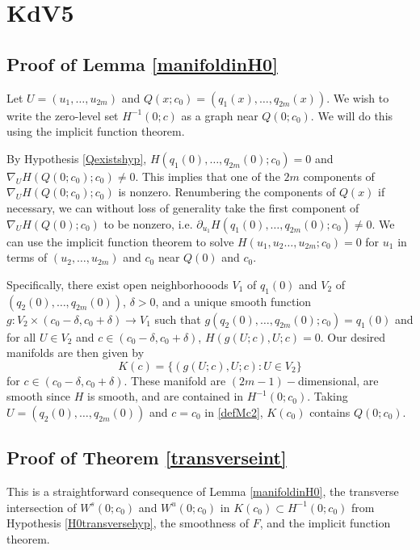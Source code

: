 \documentclass[thesis.tex]{subfiles}
\begin{document}
\iffulldocument\else
	\chapter{KdV5}
\fi

\section{Proof of Lemma \ref{manifoldinH0}}

Let $U = (u_1, \dots, u_{2m})$ and $Q(x; c_0) = (q_1(x), \dots, q_{2m}(x))$. We wish to write the zero-level set $H^{-1}(0; c)$ as a graph near $Q(0; c_0)$. We will do this using the implicit function theorem.

By Hypothesis \ref{Qexistshyp}, $H(q_1(0), \dots, q_{2m}(0); c_0) = 0$ and $\nabla_U H(Q(0; c_0); c_0) \neq 0$. This implies that one of the $2m$ components of $\nabla_U H(Q(0; c_0); c_0)$ is nonzero. Renumbering the components of $Q(x)$ if necessary, we can without loss of generality take the first component of $\nabla_U H(Q(0); c_0)$ to be nonzero, i.e. $\partial_{u_1}H(q_1(0), \dots, q_{2m}(0); c_0) \neq 0$. We can use the implicit function theorem to solve $H(u_1, u_2 \dots, u_{2m}; c_0) = 0$ for $u_1$ in terms of $(u_2, \dots, u_{2m})$ and $c_0$ near $Q(0)$ and $c_0$.

Specifically, there exist open neighborhooods $V_1$ of $q_1(0)$ and $V_2$ of $(q_2(0), \dots, q_{2m}(0))$, $\delta > 0$, and a unique smooth function $g: V_2 \times (c_0 - \delta, c_0 + \delta) \rightarrow V_1$ such that $g(q_2(0), \dots, q_{2m}(0); c_0) = q_1(0)$ and for all $U \in V_2$ and $c \in (c_0 - \delta, c_0 + \delta)$, $H(g(U; c),U; c) = 0$. Our desired manifolds are then given by
\begin{equation}\label{defMc2}
K(c) = \{ (g(U; c), U; c) : U \in V_2 \}
\end{equation}
for $c \in (c_0 - \delta, c_0 + \delta)$. These manifold are $(2m-1)-$dimensional, are smooth since $H$ is smooth, and are contained in $H^{-1}(0; c_0)$. Taking $U = (q_2(0), \dots, q_{2m}(0))$ and $c = c_0$ in \eqref{defMc2}, $K(c_0)$ contains $Q(0; c_0)$.

\section{Proof of Theorem \ref{transverseint}}

This is a straightforward consequence of Lemma \ref{manifoldinH0}, the transverse intersection of $W^s(0; c_0)$ and $W^u(0; c_0)$ in $K(c_0) \subset H^{-1}(0; c_0)$ from Hypothesis \ref{H0transversehyp}, the smoothness of $F$, and the implicit function theorem. 
\end{document}
